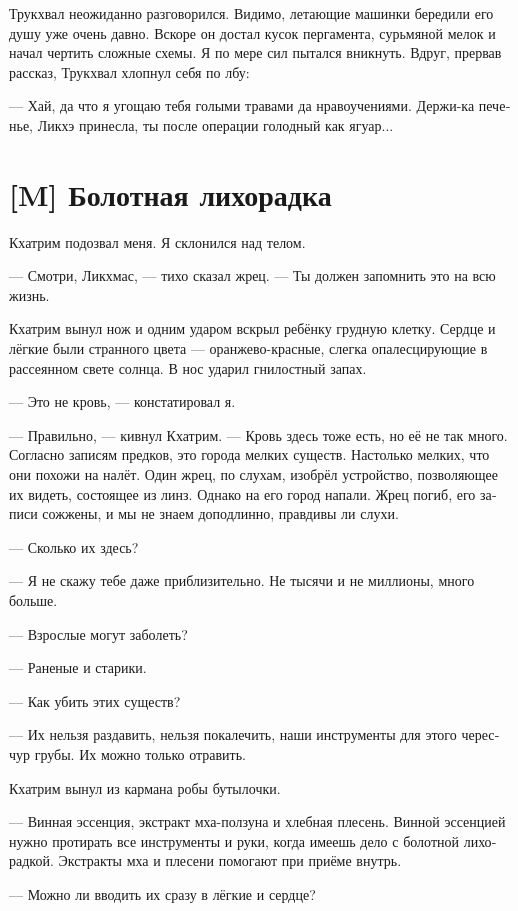 \documentclass[a4paper,12pt,fleqn]{book}\usepackage{cooltooltips}\usepackage{polyglossia}\setdefaultlanguage[babelshorthands=true]{russian}\setotherlanguage{english}\defaultfontfeatures{Ligatures=TeX,Mapping=tex-text} \usepackage{xcolor}\definecolor{lightgray}{HTML}{bbbbbb}\color{lightgray}\newcommand{\ml}[3]{\textenglish{\textcolor{black}{#3}}}
\begin{document}
{Трукхвал неожиданно разговорился.
Видимо, летающие машинки бередили его душу уже очень давно.
Вскоре он достал кусок пергамента, сурьмяной мелок и начал чертить сложные схемы.
Я по мере сил пытался вникнуть.
Вдруг, прервав рассказ, Трукхвал хлопнул себя по лбу:

--- Хай, да что я угощаю тебя голыми травами да нравоучениями.
Держи-ка печенье, Ликхэ принесла, ты после операции голодный как ягуар...

\section{[M] Болотная лихорадка}

Кхатрим подозвал меня.
Я склонился над телом.

--- Смотри, Ликхмас, --- тихо сказал жрец.
--- Ты должен запомнить это на всю жизнь.

Кхатрим вынул нож и одним ударом вскрыл ребёнку грудную клетку.
Сердце и лёгкие были странного цвета --- оранжево-красные, слегка опалесцирующие в рассеянном свете солнца.
В нос ударил гнилостный запах.

--- Это не кровь, --- констатировал я.

--- Правильно, --- кивнул Кхатрим.
--- Кровь здесь тоже есть, но её не так много.
Согласно записям предков, это города мелких существ.
Настолько мелких, что они похожи на налёт.
Один жрец, по слухам, изобрёл устройство, позволяющее их видеть, состоящее из линз.
Однако на его город напали.
Жрец погиб, его записи сожжены, и мы не знаем доподлинно, правдивы ли слухи.

--- Сколько их здесь?

--- Я не скажу тебе даже приблизительно.
Не тысячи и не миллионы, много больше.

--- Взрослые могут заболеть?

--- Раненые и старики.

--- Как убить этих существ?

--- Их нельзя раздавить, нельзя покалечить, наши инструменты для этого чересчур грубы.
Их можно только отравить.

Кхатрим вынул из кармана робы бутылочки.

--- Винная эссенция, экстракт мха-ползуна и хлебная плесень.
Винной эссенцией нужно протирать все инструменты и руки, когда имеешь дело с болотной лихорадкой.
Экстракты мха и плесени помогают при приёме внутрь.

--- Можно ли вводить их сразу в лёгкие и сердце?

}
\end{document}
